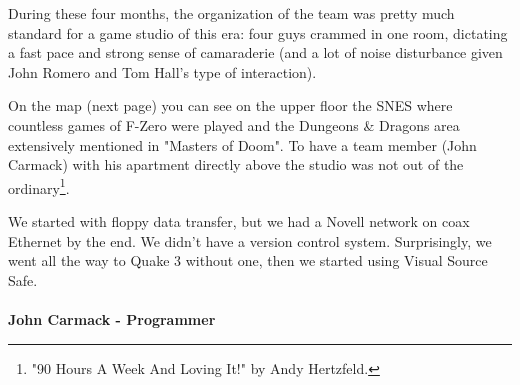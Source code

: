 \documentclass[book.tex]{subfiles}
\begin{document}
\par

During these four months, the organization of the team was pretty much standard for a game studio of this era: four guys crammed in one room, dictating a fast pace and strong sense of camaraderie (and a lot of noise disturbance given John Romero and Tom Hall's type of interaction).\\
\par On the map (next page) you can see on the upper floor the SNES where countless games of F-Zero were played and the Dungeons \& Dragons area extensively mentioned in "Masters of Doom". To have a team member (John Carmack) with his apartment directly above the studio was not out of the ordinary\footnote{ "90 Hours A Week And Loving It!" by Andy Hertzfeld.}.\\
\par
\begin{fancyquotes}
We started with floppy data transfer, but we had a Novell network on coax Ethernet by the end\footnotemark. We didn't have a version control system.  Surprisingly, we went all the way to Quake 3 without one, then we started using Visual Source Safe.\\
 \\
\textbf{John Carmack - Programmer}
\end{fancyquotes}
\end{document}
